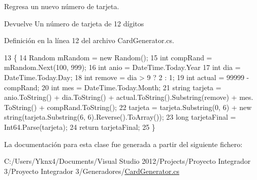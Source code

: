 Regresa un nuevo número de tarjeta. 

\begin{DoxyReturn}{Devuelve}
Un número de tarjeta de 12 dígitos
\end{DoxyReturn}


Definición en la línea 12 del archivo Card\-Generator.\-cs.


\begin{DoxyCode}
13         \{
14             Random mRandom = \textcolor{keyword}{new} Random();
15             \textcolor{keywordtype}{int} compRand = mRandom.Next(100, 999);
16             \textcolor{keywordtype}{int} anio = DateTime.Today.Year %
17             \textcolor{keywordtype}{int} dia = DateTime.Today.Day;
18             \textcolor{keywordtype}{int} \textcolor{keyword}{remove} = dia > 9 ? 2 : 1;
19             \textcolor{keywordtype}{int} actual = 99999 - compRand;
20             \textcolor{keywordtype}{int} mes = DateTime.Today.Month;
21             \textcolor{keywordtype}{string} tarjeta = anio.ToString() + dia.ToString() + actual.ToString().Substring(\textcolor{keyword}{remove}) + mes.
      ToString() + compRand.ToString();
22             tarjeta = tarjeta.Substring(0, 6) + \textcolor{keyword}{new} string(tarjeta.Substring(6, 6).Reverse().ToArray());
23             \textcolor{keywordtype}{long} tarjetaFinal = Int64.Parse(tarjeta);
24             \textcolor{keywordflow}{return} tarjetaFinal;
25         \}
\end{DoxyCode}


La documentación para esta clase fue generada a partir del siguiente fichero\-:\begin{DoxyCompactItemize}
\item 
C\-:/\-Users/\-Yknx4/\-Documents/\-Visual Studio 2012/\-Projects/\-Proyecto Integrador 3/\-Proyecto Integrador 3/\-Generadores/\hyperlink{_card_generator_8cs}{Card\-Generator.\-cs}\end{DoxyCompactItemize}

